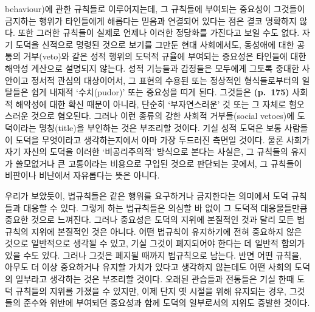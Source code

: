 \begin{enumerate}
  behaviour)에 관한 규칙들로 이루어지는데, 그 규칙들에 부여되는 중요성이
  그것들이 금지하는 행위가 타인들에게 해롭다는 믿음과 연결되어 있다는
  점은 결코 명확하지 않다. 또한 그러한 규칙들이 실제로 언제나 이러한
  정당화를 가진다고 보일 수도 없다. 자기 도덕을 신적으로 명령된 것으로
  보기를 그만둔 현대 사회에서도, 동성애에 대한 공통의 거부(veto)와 같은
  성적 행위의 도덕적 규율에 부여되는 중요성은 타인들에 대한 해악성
  계산으로 설명되지 않는다. 성적 기능들과 감정들은 모두에게 그토록
  중대한 사안이고 정서적 관심의 대상이어서, 그 표현의 수용된 또는
  정상적인 형식들로부터의 일탈들은 쉽게 내재적 ‘수치(pudor)’ 또는
  중요성을 띠게 된다. 그것들은 \textbf{(p.~175)} 사회적 해악성에 대한
  확신 때문이 아니라, 단순히 ‘부자연스러운’ 것 또는 그 자체로 혐오스러운
  것으로 혐오된다. 그러나 이런 종류의 강한 사회적 거부들(social
  vetoes)에 도덕이라는 명칭(title)을 부인하는 것은 부조리할 것이다. 기실
  성적 도덕은 보통 사람들이 도덕을 무엇이라고 생각하는지에서 아마 가장
  두드러진 측면일 것이다. 물론 사회가 자기 자신의 도덕을 이러한
  ‘비공리주의적’ 방식으로 본다는 사실은, 그 규칙들의 유지가 쓸모없거나
  큰 고통이라는 비용으로 구입된 것으로 판단되는 곳에서, 그 규칙들이
  비판이나 비난에서 자유롭다는 뜻은 아니다.
\end{enumerate}

우리가 보았듯이, 법규칙들은 같은 행위를 요구하거나 금지한다는 의미에서
도덕 규칙들과 대응할 수 있다. 그렇게 하는 법규칙들은 의심할 바 없이 그
도덕적 대응물들만큼 중요한 것으로 느껴진다. 그러나 중요성은 도덕의
지위에 본질적인 것과 달리 모든 법규칙의 지위에 본질적인 것은 아니다.
어떤 법규칙이 유지하기에 전혀 중요하지 않은 것으로 일반적으로 생각될 수
있고, 기실 그것이 폐지되어야 한다는 데 일반적 합의가 있을 수도 있다.
그러나 그것은 폐지될 때까지 법규칙으로 남는다. 반면 어떤 규칙을, 아무도
더 이상 중요하거나 유지할 가치가 있다고 생각하지 않는데도 어떤 사회의
도덕의 일부라고 생각하는 것은 부조리할 것이다. 오래된 관습들과 전통들은
기실 한때 도덕 규칙들의 지위를 가졌을 수 있지만, 이제 단지 옛 시절을
위해 유지되는 경우, 그것들의 준수와 위반에 부여되던 중요성과 함께 도덕의
일부로서의 지위도 증발한 것이다.

